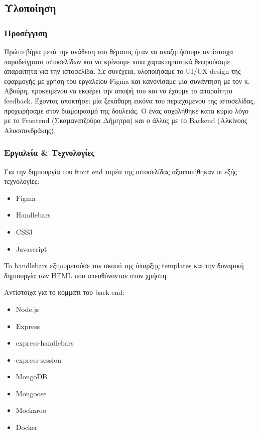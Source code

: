 \documentclass[manuscript,screen,review, language=greek, language=english]{acmart}
\begin{document}
\subsection{Υλοποίηση}

\subsubsection{Προσέγγιση}
	Πρώτο βήμα μετά την ανάθεση του θέματος ήταν να αναζητήσουμε αντίστοιχα παραδείγματα
	ιστοσελίδων και να κρίνουμε ποια χαρακτηριστικά θεωρούσαμε απαραίτητα για την
	ιστοσελίδα. Σε συνέχεια, υλοποιήσαμε το UI/UX design της εφαρμογής με χρήση του
	εργαλείου Figma και κανονίσαμε μία συνάντηση με τον κ. Αβούρη, προκειμένου να εκφέρει
	την
	αποψή του και να έχουμε το απαραίτητο feedback. Έχοντας αποκτήσει μία ξεκάθαρη
	εικόνα του περιεχομένου της ιστοσελίδας, προχωρήσαμε στον διαμοιρασμό της δουλειάς.
	Ο ένας ασχολήθηκε κατα κύριο λόγο με το Frontend (Σκαμανατζούρα Δήμητρα) και ο
	άλλος με το Backend (Αλκίνοος Αλυσσανδράκης).

\subsubsection{Εργαλεία \& Τεχνολογίες}
	Για την δημιουργία του front end τομέα της ιστοσελίδας αξιοποιήθηκαν οι εξής
	τεχνολογίες:

	\begin{itemize}
		\item Figma \cite{Figma}
		\item Handlebars \cite{Handlebars}
		\item CSS3 \cite{CSS}
		\item Javascript \cite{Javascript}
	\end{itemize}

	To handlebars εξηπυρετούσε τον σκοπό της ύπαρξης templates και την δυναμική
	δημιουργία των HTML που απευθύνονταν στον χρήστη.

	Αντίστοιχα για το κομμάτι του back end:

	\begin{itemize}
		\item Node.js \cite{Node.js}
		\item Express \cite{Express}
		\item express-handlebars \cite{express-handlebars}
		\item express-session \cite{express-session}
		\item MongoDB \cite{MongoDB}
		\item Mongoose \cite{Mongoose}
		\item Mockaroo \cite{Mockaroo}
		\item Docker \cite{Docker}
	\end{itemize}
\end{document}
